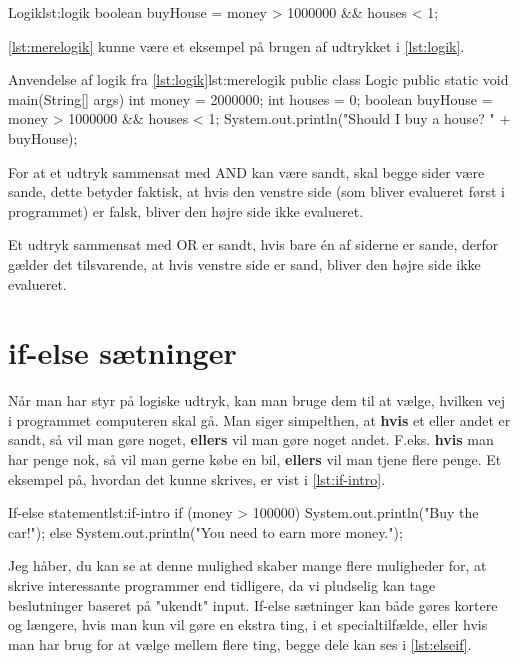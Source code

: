 {\begin{JavaCode}{Logik}{lst:logik}
	boolean buyHouse = money > 1000000 && houses < 1;
\end{JavaCode}

\autoref{lst:merelogik} kunne være et eksempel på brugen af udtrykket i \autoref{lst:logik}.

\begin{JavaCode}{Anvendelse af logik fra \autoref{lst:logik}}{lst:merelogik}
	public class Logic {
		public static void main(String[] args) {
			int money = 2000000;
			int houses = 0;
			boolean buyHouse = money > 1000000 && houses < 1;
			System.out.println("Should I buy a house? " 
						+ buyHouse);
		}
	}
\end{JavaCode}

\begin{remark}
	For at et udtryk sammensat med AND kan være sandt, skal begge sider være sande, dette betyder faktisk, at hvis den venstre side (som bliver evalueret først i programmet) er falsk, bliver den højre side ikke evalueret.
	
	Et udtryk sammensat med OR er sandt, hvis bare én af siderne er sande, derfor gælder det tilsvarende, at hvis venstre side er sand, bliver den højre side ikke evalueret.
\end{remark}

\section{if-else sætninger}
Når man har styr på logiske udtryk, kan man bruge dem til at vælge, hvilken vej i programmet computeren skal gå. Man siger simpelthen, at \textbf{hvis} et eller andet er sandt, så vil man gøre noget, \textbf{ellers} vil man gøre noget andet. F.eks. \textbf{hvis} man har penge nok, så vil man gerne købe en bil, \textbf{ellers} vil man tjene flere penge. Et eksempel på, hvordan det kunne skrives, er vist i \autoref{lst:if-intro}.

\begin{JavaCode}{If-else statement}{lst:if-intro}
	if (money > 100000) {
		System.out.println("Buy the car!");
	} else {
		System.out.println("You need to earn more money.");
	}
\end{JavaCode}

Jeg håber, du kan se at denne mulighed skaber mange flere muligheder for, at skrive interessante programmer end tidligere, da vi pludselig kan tage beslutninger baseret på "ukendt" input. If-else sætninger kan både gøres kortere og længere, hvis man kun vil gøre en ekstra ting, i et specialtilfælde, eller hvis man har brug for at vælge mellem flere ting, begge dele kan ses i \autoref{lst:elseif}.

}
